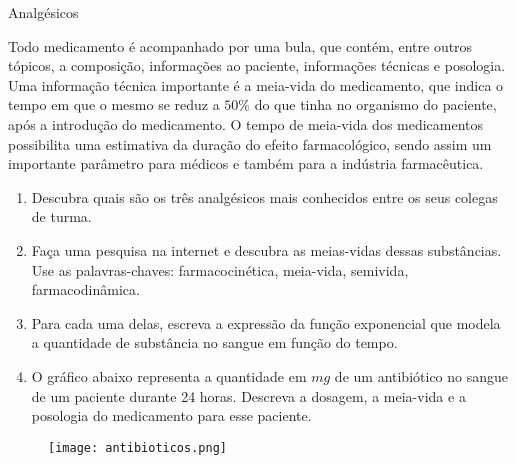\begin{task}{Analgésicos}

Todo medicamento é acompanhado por uma bula, que contém, entre outros tópicos, a composição, informações ao paciente, informações técnicas e posologia. Uma informação técnica importante é a meia-vida do medicamento, que indica o tempo em que o mesmo se reduz a $50\%$ do que tinha no organismo do paciente, após a introdução do medicamento. O tempo de meia-vida dos medicamentos possibilita uma estimativa da duração do efeito farmacológico, sendo assim um importante parâmetro para médicos e também para a indústria farmacêutica.

\begin{enumerate}

\item{} Descubra quais são os três analgésicos mais conhecidos entre os seus colegas de turma.

\item {} Faça uma pesquisa na internet e descubra as meias-vidas dessas substâncias. Use as palavras-chaves: farmacocinética, meia-vida, semivida, farmacodinâmica.

\item {} Para cada uma delas, escreva a expressão da função exponencial que modela a quantidade de substância no sangue em função do tempo.

\item{} O gráfico abaixo representa a quantidade em $mg$ de um antibiótico no sangue de um paciente durante 24 horas. Descreva a dosagem, a meia-vida e a posologia do medicamento para esse paciente.

\end{enumerate}

\begin{figure}[H]
\centering
\texttt{[image: antibioticos.png]}
\end{figure}

\end{task}




